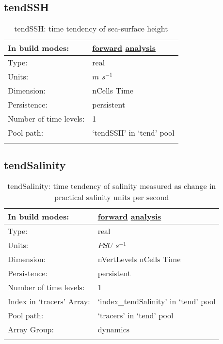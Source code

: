 \subsection[tendSSH]{tendSSH}
\label{subsec:var_sec_tend_tendSSH}
\begin{center}
\begin{longtable}{| p{2.0in} | p{4.0in} |}
        \hline 
        In build modes: & \hyperref[subsec:forward_var_tab_tend]{forward} \hyperref[subsec:analysis_var_tab_tend]{analysis} \\
        \hline 
        Type: & real \\
        \hline 
        Units: & $m$ $s^{-1}$ \\
        \hline 
        Dimension: & nCells Time \\
        \hline 
        Persistence: & persistent \\
        \hline 
        Number of time levels: & 1 \\
        \hline 
            Pool path: & `tendSSH' in `tend' pool \\
		 \hline 
    \caption{tendSSH: time tendency of sea-surface height}
\end{longtable}
\end{center}
\subsection[tendSalinity]{tendSalinity}
\label{subsec:var_sec_tend_tendSalinity}
\begin{center}
\begin{longtable}{| p{2.0in} | p{4.0in} |}
        \hline 
        In build modes: & \hyperref[subsec:forward_var_tab_tend]{forward} \hyperref[subsec:analysis_var_tab_tend]{analysis} \\
        \hline 
        Type: & real \\
        \hline 
        Units: & $PSU$ $s^{-1}$ \\
        \hline 
        Dimension: & nVertLevels nCells Time \\
        \hline 
        Persistence: & persistent \\
        \hline 
        Number of time levels: & 1 \\
        \hline 
		 Index in `tracers' Array: & `index\_tendSalinity' in `tend' pool \\
		 \hline 
            Pool path: & `tracers' in `tend' pool \\
		 \hline 
		 Array Group: & dynamics \\
		 \hline 
    \caption{tendSalinity: time tendency of salinity measured as change in practical salinity units per second}
\end{longtable}
\end{center}
